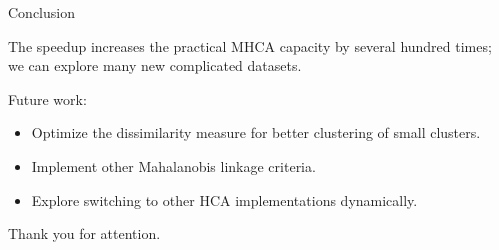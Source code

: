 \documentclass[10pt]{beamer}
\begin{document}
\begin{frame}{Conclusion}
	
	The speedup increases the practical MHCA capacity by several hundred times; we can explore many new complicated datasets.
	
	Future work: 
	\begin{itemize}
		\item Optimize the dissimilarity measure for better clustering of small clusters.
		\item Implement other Mahalanobis linkage criteria.
		\item Explore switching to other HCA implementations dynamically.
	\end{itemize}
	
\end{frame}

\begin{frame}[standout]
	
  Thank you for attention.

\end{frame}
\end{document}
